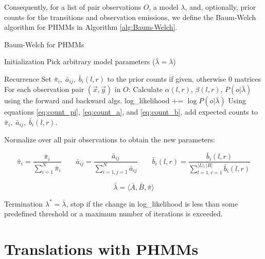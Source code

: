 \documentclass[a4paper,10pt]{article}
\begin{document}
Consequently, for a list of pair observations $O$, a model $\lambda$, and,
optionally, prior counts for the transitions and observation emissions, we
define the Baum-Welch algorithm for PHMMs in Algorithm \ref{alg:Baum-Welch}.

\vspace{0.4cm}
\begin{algorithm}[H]
\caption{Baum-Welch for PHMMs}
  \DontPrintSemicolon
{}
\BlankLine
{}
\BlankLine

Initialization\;
\BlankLine
\Indp Pick arbitrary model parameters ($\bar \lambda = \lambda$)\;
\BlankLine

\Indm Recurrence\;\Indp
\BlankLine
Set $\bar \pi_i,\; \bar a_{ij},\; \bar b_i(l, r)$ to the prior counts if given,
otherwise 0 matrices\;
For each observation pair $(\vec{x}, \vec{y})$ in $O$:\;\Indp
Calculate $\alpha(l,r)$, $\beta(l,r)$, $P(o | \bar\lambda)$ using the forward
and backward algs.\;
log\_likelihood += $\log P(o | \bar \lambda)$\;
Using equations \ref{eq:count_pi}, \ref{eq:count_a}, and \ref{eq:count_b}, add
expected counts to $\bar \pi_i,\; \bar a_{ij},\; \bar b_i(l, r)$.

\BlankLine
\Indm Normalize over all pair observations to obtain the new parameters:

$$\bar \pi_i = \frac{\bar \pi_i}{\displaystyle\sum_{i=1}^N \bar \pi_i} \qquad
\bar a_{ij} = \frac{\bar a_{ij}}{\displaystyle\sum_{i=1, j=1}^N \bar a_{ij}}
\qquad \bar b_i(l,r) = \frac{\bar b_i(l,r)}{\displaystyle\sum_{l=1, r=1}^{|L|, |R|}
  \bar b_i(l,r)}$$

$$\bar \lambda = \langle \bar A, \bar B, \bar \pi \rangle$$

\Indm Termination\;\Indp
\BlankLine
$\lambda^* = \bar\lambda$, stop if the change in log\_likelihood is less than some predefined threshold or a maximum number of iterations is
exceeded.
\BlankLine
\label{alg:Baum-Welch}
\end{algorithm}


\nocite{Rabiner:HMMs}

\section{Translations with PHMMs}
\end{document}
